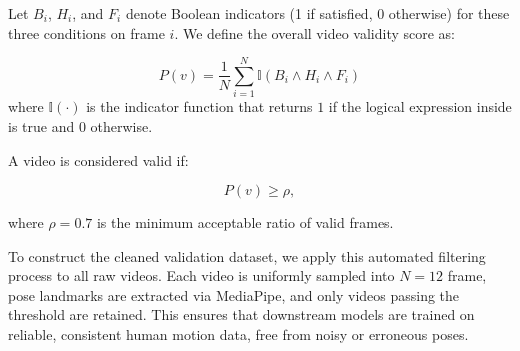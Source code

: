 \documentclass[a4paper,12pt]{article}
\begin{document}
Let $B_i$, $H_i$, and $F_i$ denote Boolean indicators (1 if satisfied, 0 otherwise) for these three conditions on frame $i$.
We define the overall video validity score as:

\begin{equation}
P(v) = \frac{1}{N} \sum_{i=1}^{N} \mathbb{I}(B_i \land H_i \land F_i)
\end{equation}
where $\mathbb{I}(\cdot)$ is the indicator function that returns $1$ if the logical expression inside is true and $0$ otherwise.


A video is considered valid if:

\begin{equation}
P(v) \geq \rho,
\end{equation}

where $\rho = 0.7$ is the minimum acceptable ratio of valid frames.

To construct the cleaned validation dataset, we apply this automated filtering process to all raw videos.
Each video is uniformly sampled into $N = 12$ frame, pose landmarks are extracted via MediaPipe, and only videos passing the threshold are retained.
This ensures that downstream models are trained on reliable, consistent human motion data, free from noisy or erroneous poses.



\end{document}

